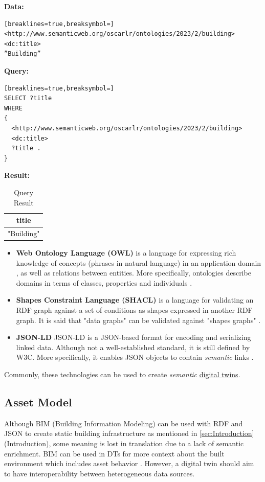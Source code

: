 \documentclass{article}
\begin{document}
\textbf{Data:}
\begin{Verbatim}[breaklines=true,breaksymbol=]
<http://www.semanticweb.org/oscarlr/ontologies/2023/2/building> 
<dc:title> 
”Building”
\end{Verbatim}
\textbf{Query:}
\begin{Verbatim}[breaklines=true,breaksymbol=]
SELECT ?title 
WHERE
{
  <http://www.semanticweb.org/oscarlr/ontologies/2023/2/building> 
  <dc:title> 
  ?title . 
}
\end{Verbatim}
\textbf{Result:}
\begin{table}[H]
    \begin{tabular}{|c|}
        \hline
        \textbf{title} \\
        \hline
        "Building" \\
        \hline
    \end{tabular}
    \caption{Query Result}
    \label{tab:my_label}
\end{table}
    

\begin{itemize}
    \item \textbf{Web Ontology Language (OWL)} is a language for expressing rich knowledge of concepts (phrases in natural language) in an application domain \cite{szolovits_overview_1977}, as well as relations between entities. More specifically, ontologies describe domains in terms of classes, properties and individuals \cite{bechhofer_owl_2009}.

    \item \textbf{Shapes Constraint Language (SHACL)} is a language for validating an RDF graph against a set of conditions as shapes expressed in another RDF graph. It is said that "data graphs" can be validated against "shapes graphs" \cite{noauthor_shapes_nodate}.
    
    \item \textbf{JSON-LD} JSON-LD is a JSON-based format for encoding and serializing linked data. Although not a well-established standard, it is still defined by W3C.  More specifically, it enables JSON objects to contain \emph{semantic} links \cite{noauthor_json-based_nodate}.
\end{itemize}

Commonly, these technologies can be used to create \emph{semantic} \hyperref[subsec:DigitalTwins]{digital twins}.

\subsection{Asset Model}
Although BIM (Building Information Modeling) can be used with RDF and JSON to create static building infrastructure as mentioned in \ref{sec:Introduction}(Introduction), some meaning is lost in translation due to a lack of semantic enrichment. BIM can be used in DTs for more context about the built environment which includes asset behavior \cite{godager_concept_2021}. However, a digital twin should aim to have interoperability between heterogeneous data sources.
\end{document}

